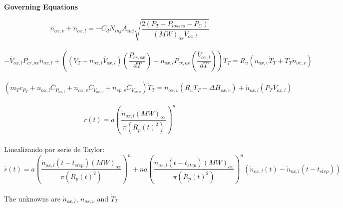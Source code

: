\documentclass[10pt]{article}
\begin{document}
\begin{center}
    \textbf{Governing Equations}
\end{center}

\[
	\dot{n}_{ox,v} + \dot{n}_{ox,l} = -C_{d}N_{inj}A_{inj}\sqrt{\frac{2(P_{T}-P_{losses}-P_{C})}{(MW)_{ox}\overline{V}_{ox,l}}}
\]\\

\[
	-\overline{V}_{ox,l} P_{cr,ox} \dot{n}_{ox,l} + \left( \left(V_{T}-n_{ox,l}\overline{V}_{ox,l}\right) \left( \frac{P_{cr,ox}}{dT} \right) -n_{ox,l} P_{cr,ox} \left( \frac{\overline{V}_{ox,l}}{dT} \right) \right) \dot{T}_{T} = R_{u} \left( n_{ox,v} \dot{T}_{T} + T_{T} \dot{n}_{ox,v} \right)
\]\\

\[
	(m_{T}c_{P_{T}} + n_{ox,l}\overline{C}_{P_{ox,l}} + n_{ox,v}\overline{C}_{V_{ox,v}} + n_{sp,v}\overline{C}_{V_{sp,v}})\dot{T}_{T} = \dot{n}_{ox,v} (R_{u}T_{T} - \Delta\overline{H}_{ox,v}) + \dot{n}_{ox,l}(P_{T}\overline{V}_{ox,l})
\]\\

\[
	\dot{r}(t) = a \left( \frac{ \dot{n}_{ox,l} (MW)_{ox} }{\pi(R_{p}(t)^{2})} \right)^{n}
\]\\

Linealizando por serie de Taylor: \\

\[
	\dot{r}(t) = a \left( \frac{ \dot{n}_{ox,l}(t-t_{step}) (MW)_{ox} }{\pi(R_{p}(t)^{2})} \right)^{n} + n a \left( \frac{ \dot{n}_{ox,l}(t-t_{step}) (MW)_{ox} }{\pi(R_{p}(t)^{2})} \right)^{n}(\dot{n}_{ox,l}(t) - \dot{n}_{ox,l}(t-t_{step}))
\]\\

The unknowns are $\dot{n}_{ox,l}$, $\dot{n}_{ox,v}$ and $\dot{T}_{T}$
\end{document}
